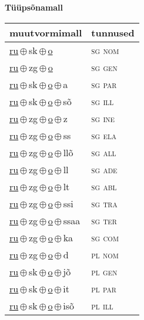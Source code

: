 

\vspace{3.5em}
\noindent \begin{minipage}{\textwidth}
\noindent \textbf{Tüüpsõnamall \,}\\

\begin{sideways}
\begin{tabular}{l l}
muutvormimall & tunnused \\
\hline
\underline{ru}\,$\oplus$\,sk\,$\oplus$\,\underline{o} & \textsc{ sg nom } \\
\underline{ru}\,$\oplus$\,zg\,$\oplus$\,\underline{o} & \textsc{ sg gen } \\
\underline{ru}\,$\oplus$\,sk\,$\oplus$\,\underline{o}\,$\oplus$\,a & \textsc{ sg par } \\
\underline{ru}\,$\oplus$\,sk\,$\oplus$\,\underline{o}\,$\oplus$\,sõ & \textsc{ sg ill } \\
\underline{ru}\,$\oplus$\,zg\,$\oplus$\,\underline{o}\,$\oplus$\,z & \textsc{ sg ine } \\
\underline{ru}\,$\oplus$\,zg\,$\oplus$\,\underline{o}\,$\oplus$\,ss & \textsc{ sg ela } \\
\underline{ru}\,$\oplus$\,zg\,$\oplus$\,\underline{o}\,$\oplus$\,llõ & \textsc{ sg all } \\
\underline{ru}\,$\oplus$\,zg\,$\oplus$\,\underline{o}\,$\oplus$\,ll & \textsc{ sg ade } \\
\underline{ru}\,$\oplus$\,zg\,$\oplus$\,\underline{o}\,$\oplus$\,lt & \textsc{ sg abl } \\
\underline{ru}\,$\oplus$\,zg\,$\oplus$\,\underline{o}\,$\oplus$\,ssi & \textsc{ sg tra } \\
\underline{ru}\,$\oplus$\,zg\,$\oplus$\,\underline{o}\,$\oplus$\,ssaa & \textsc{ sg ter } \\
\underline{ru}\,$\oplus$\,zg\,$\oplus$\,\underline{o}\,$\oplus$\,ka & \textsc{ sg com } \\
\underline{ru}\,$\oplus$\,zg\,$\oplus$\,\underline{o}\,$\oplus$\,d & \textsc{ pl nom } \\
\underline{ru}\,$\oplus$\,sk\,$\oplus$\,\underline{o}\,$\oplus$\,jõ & \textsc{ pl gen } \\
\underline{ru}\,$\oplus$\,sk\,$\oplus$\,\underline{o}\,$\oplus$\,it & \textsc{ pl par } \\
\underline{ru}\,$\oplus$\,sk\,$\oplus$\,\underline{o}\,$\oplus$\,isõ & \textsc{ pl ill } \\

\end{tabular}
\end{sideways}
\end{minipage}
